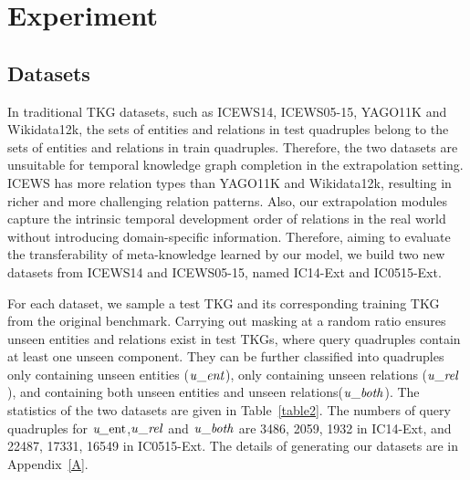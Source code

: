 \documentclass[sigconf]{acmart}
\begin{document}
\section{Experiment}


\setlength{\parskip}{0.1cm}

\subsection{Datasets}

\par
In traditional TKG datasets, such as ICEWS14, ICEWS05-15, YAGO11K and Wikidata12k, the sets of entities and relations in test quadruples belong to the sets of entities and relations in train quadruples. Therefore, the two datasets are unsuitable for temporal knowledge graph completion in the extrapolation setting.
ICEWS has more relation types than YAGO11K and Wikidata12k, resulting in richer and more challenging relation patterns. Also, our extrapolation modules capture the intrinsic temporal development order of relations in the real world without introducing domain-specific information. Therefore, aiming to evaluate the transferability of meta-knowledge learned by our model, we build two new datasets from ICEWS14 and ICEWS05-15, named IC14-Ext and IC0515-Ext. 
\par
For each dataset, we sample a test TKG and its corresponding training TKG from the original benchmark. Carrying out masking at a random ratio ensures unseen entities and relations exist in test TKGs, where query quadruples contain at least one unseen component. They can be further classified into quadruples only containing unseen entities ($\text {\emph{u}\_\emph{ent}}$), only containing unseen relations ($\text {\emph{u}\_\emph{rel}}$), and containing both unseen entities and unseen relations($\text {\emph{u}\_\emph{both}}$). The statistics of the two datasets are given in Table~\ref{table2}. The numbers of query quadruples for $\text {\emph{u\_\emph{ent}}}$,$\text {\emph{u}\_\emph{rel}}$ and $\text {\emph{u}\_\emph{both}}$ are 3486, 2059, 1932 in IC14-Ext, and 22487, 17331, 16549 in IC0515-Ext. The details of generating our datasets are in Appendix~\ref{A}.
\end{document}
